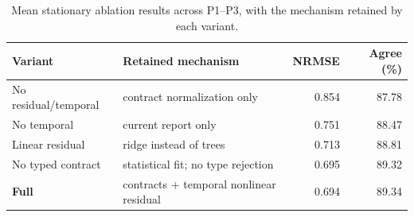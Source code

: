 
\begin{table}[t]
\caption{Mean stationary ablation results across P1--P3, with the mechanism retained by each variant.}
\label{tab:ablation}
\centering
\scriptsize
\setlength{\tabcolsep}{3pt}
\begin{tabular}{llrr}
\toprule
Variant & Retained mechanism & NRMSE & Agree (\%) \\
\midrule
No residual/temporal & contract normalization only & 0.854 & 87.78 \\
No temporal & current report only & 0.751 & 88.47 \\
Linear residual & ridge instead of trees & 0.713 & 88.81 \\
No typed contract & statistical fit; no type rejection & 0.695 & 89.32 \\
\textbf{Full} & contracts + temporal nonlinear residual & 0.694 & 89.34 \\
\bottomrule
\end{tabular}
\end{table}
